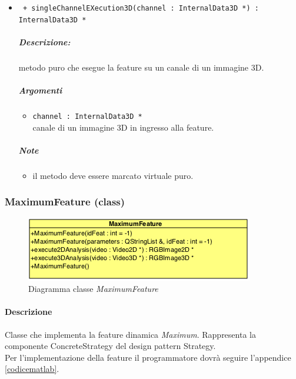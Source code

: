 \begin{itemize}
	\item \color{blue}\verb! + singleChannelEXecution3D(channel : InternalData3D *) : InternalData3D *!
		\color{black}
		\subparagraph{Descrizione:} metodo puro che esegue la feature su un canale di un immagine 3D.
		\subparagraph{Argomenti}
			\begin{itemize}
				\item \color{RoyalPurple} \verb!channel : InternalData3D * ! \\ 
				\color{black} canale di un immagine 3D in ingresso alla feature.		
			\end{itemize}
		\subparagraph{Note}
			\begin{itemize}
				\item il metodo deve essere marcato virtuale puro.
			\end{itemize}
			
	\end{itemize}
	
\color{black}
\pagebreak
\subsubsection{MaximumFeature (class)}
\label{MaximumFeature}
\begin{figure}[!h]
\centering
			\includegraphics[scale=1]{./Content/Immagini/modelCore/MaximumFeature.png}
			\caption{Diagramma classe \textsl{MaximumFeature}}
			\label{MaximumFeature_img}
\end{figure}

\paragraph{Descrizione \\} Classe che implementa la feature\g{} dinamica \textit{Maximum}. Rappresenta la componente ConcreteStrategy del design pattern\g{} Strategy.
\\Per l'implementazione della feature\g{} il programmatore dovrà seguire l'appendice \ref{codicematlab}.

